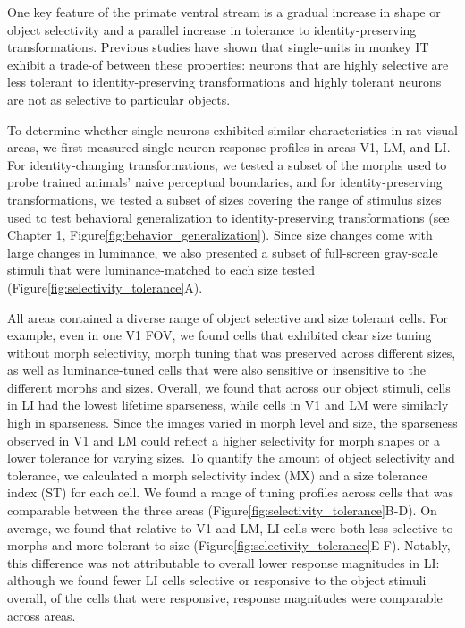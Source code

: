 One key feature of the primate ventral stream is a gradual increase in shape or object selectivity and a parallel increase in tolerance to identity-preserving transformations. Previous studies have shown that single-units in monkey IT exhibit a trade-of between these properties: neurons that are highly selective are less tolerant to identity-preserving transformations and highly tolerant neurons are not as selective to particular objects\cite{Zoccolan2007}.

To determine whether single neurons exhibited similar characteristics in rat visual areas, we first measured single neuron response profiles in areas V1, LM, and LI. For identity-changing transformations, we tested a subset of the morphs used to probe trained animals’ naive perceptual boundaries, and for identity-preserving transformations, we tested a subset of sizes covering the range of stimulus sizes used to test behavioral generalization to identity-preserving transformations (see Chapter 1, Figure\ref{fig:behavior_generalization}). Since size changes come with large changes in luminance, we also presented a subset of full-screen gray-scale stimuli that were luminance-matched to each size tested (Figure\ref{fig:selectivity_tolerance}A).


All areas contained a diverse range of object selective and size tolerant cells. For example, even in one V1 FOV, we found cells that exhibited clear size tuning without morph selectivity, morph tuning that was preserved across different sizes, as well as luminance-tuned cells that were also sensitive or insensitive to the different morphs and sizes. Overall, we found that across our object stimuli, cells in LI had the lowest lifetime sparseness, while cells in V1 and LM were similarly high in sparseness. Since the images varied in morph level and size, the sparseness observed in V1 and LM could reflect a higher selectivity for morph shapes or a lower tolerance for varying sizes. To quantify the amount of object selectivity and tolerance, we calculated a morph selectivity index (MX) and a size tolerance index (ST) for each cell\cite{Zoccolan2007}. We found a range of tuning profiles across cells that was comparable between the three areas (Figure\ref{fig:selectivity_tolerance}B-D). On average, we found that relative to V1 and LM, LI cells were both less selective to morphs and more tolerant to size (Figure\ref{fig:selectivity_tolerance}E-F). Notably, this difference was not attributable to overall lower response magnitudes in LI: although we found fewer LI cells selective or responsive to the object stimuli overall, of the cells that were responsive, response magnitudes were comparable across areas. 

